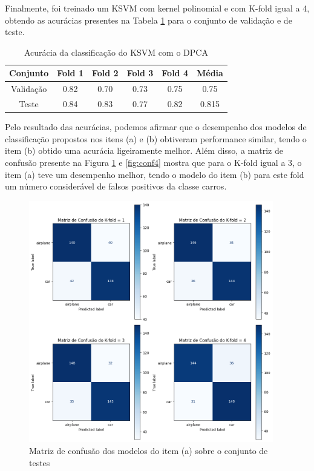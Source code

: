 \documentclass[]{abntex2}
\begin{document}
Finalmente, foi treinado um KSVM com kernel polinomial e com K-fold igual a 4, obtendo as acurácias presentes na Tabela \ref{tab:dpca_ksvm} para o conjunto de validação e de teste.

\begin{table}[H]
    \centering
    \begin{tabular}{|c|c|c|c|c|c|}
    \hline
    \rowcolor[HTML]{C0C0C0} 
    Conjunto                          & Fold 1 & Fold 2 & Fold 3 & Fold 4 & Média  \\ \hline
    \cellcolor[HTML]{C0C0C0}Validação & 0.82   & 0.70  & 0.73   & 0.75   & 0.75  \\ \hline
    \cellcolor[HTML]{C0C0C0}Teste     & 0.84   & 0.83   & 0.77   & 0.82   & 0.815 \\ \hline
    \end{tabular}
    \caption{Acurácia da classificação do KSVM com o DPCA}
    \label{tab:dpca_ksvm}
\end{table}

Pelo resultado das acurácias, podemos afirmar que o desempenho dos modelos de classificação propostos nos itens (a) e (b) obtiveram performance similar, tendo o item (b) obtido uma acurácia ligeiramente melhor. Além disso, a matriz de confusão presente na Figura \ref{fig:conf3} e \ref{fig:conf4} mostra que para o K-fold igual a 3, o item (a) teve um desempenho melhor, tendo o modelo do item (b) para este fold um número considerável de falsos positivos da classe carros.

\begin{figure}[H]
    \centering 
    \includegraphics[width=0.95\textwidth]{imgs/ex3/conf3.png}
    \caption{Matriz de confusão dos modelos do item (a) sobre o conjunto de testes}
    \label{fig:conf3} %
\end{figure}
\end{document}
